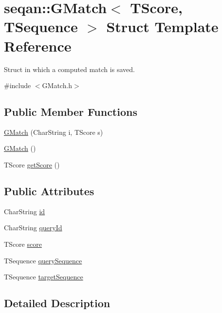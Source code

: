 \hypertarget{structseqan_1_1_g_match}{\section{seqan\-:\-:G\-Match$<$ T\-Score, T\-Sequence $>$ Struct Template Reference}
\label{structseqan_1_1_g_match}
}


Struct in which a computed match is saved.  




{\ttfamily \#include $<$G\-Match.\-h$>$}

\subsection*{Public Member Functions}
\begin{DoxyCompactItemize}
\item 
\hyperlink{structseqan_1_1_g_match_a2d9ca43c6774fc0a6ecce18a1616cee5}{G\-Match} (Char\-String i, T\-Score s)
\item 
\hyperlink{structseqan_1_1_g_match_a97931c51078da8a996ca32e634b4d10c}{G\-Match} ()
\item 
T\-Score \hyperlink{structseqan_1_1_g_match_abb18449ea53a23e2d2b00d0ca60e2ad5}{get\-Score} ()
\end{DoxyCompactItemize}
\subsection*{Public Attributes}
\begin{DoxyCompactItemize}
\item 
Char\-String \hyperlink{structseqan_1_1_g_match_ae4eac560a806ad0771f1aea4106ffd0d}{id}
\item 
Char\-String \hyperlink{structseqan_1_1_g_match_a49524158acebda7f2aa2711fa675fe5a}{query\-Id}
\item 
T\-Score \hyperlink{structseqan_1_1_g_match_a167782c90ebf893b4ed14dec10751e2d}{score}
\item 
T\-Sequence \hyperlink{structseqan_1_1_g_match_a5bf1edefeece4584350a5d8b51bf5931}{query\-Sequence}
\item 
T\-Sequence \hyperlink{structseqan_1_1_g_match_a13f2c3906e402472217935df02c0c134}{target\-Sequence}
\end{DoxyCompactItemize}


\subsection{Detailed Description}
